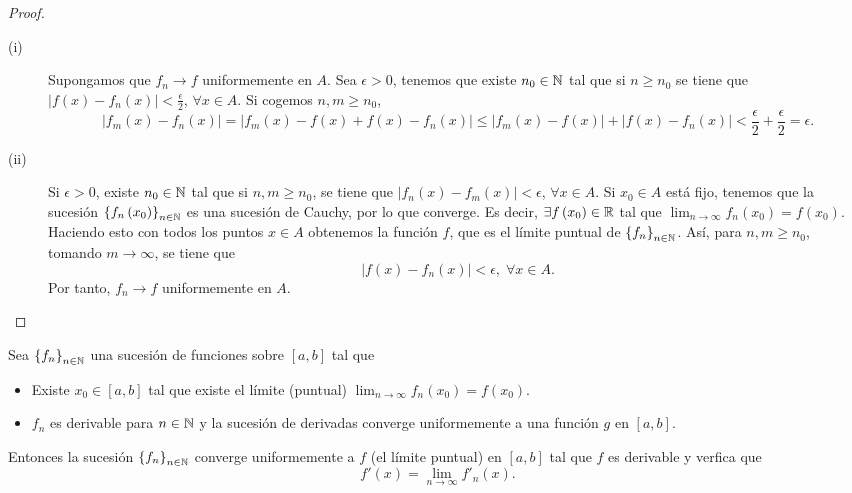 \begin{proof}
\begin{description}
\item[(i)] Supongamos que $\displaystyle f_{n} \to f $ uniformemente en $\displaystyle A $. Sea $\displaystyle \epsilon > 0 $, tenemos que existe $\displaystyle n_{0} \in \mathbb{N} $ tal que si $\displaystyle n \geq n_{0} $ se tiene que $\displaystyle \left|f\left(x\right)-f_{n}\left(x\right)\right| < \frac{\epsilon }{2} $, $\displaystyle \forall x \in A $. Si cogemos $\displaystyle n,m \geq n_{0} $,
	\[ \left|f_{m}\left(x\right)-f_{n}\left(x\right)\right| = \left|f_{m}\left(x\right)-f\left(x\right)+f\left(x\right)-f_{n}\left(x\right)\right| \leq \left|f_{m}\left(x\right)-f\left(x\right)\right|+ \left|f\left(x\right)-f_{n}\left(x\right)\right| < \frac{\epsilon }{2} + \frac{\epsilon }{2} = \epsilon  .\]
\item[(ii)] Si $\displaystyle \epsilon > 0 $, existe $\displaystyle n_{0} \in \mathbb{N} $ tal que si $\displaystyle n,m \geq n_{0} $, se tiene que $\displaystyle \left|f_{n}\left(x\right)-f_{m}\left(x\right)\right|<\epsilon  $, $\displaystyle \forall x \in A $. Si $\displaystyle x_{0} \in A $ está fijo, tenemos que la sucesión $\displaystyle \left\{ f_{n}\left(x_{0}\right)\right\} _{n\in\mathbb{N}} $ es una sucesión de Cauchy, por lo que converge. Es decir, $\displaystyle \exists f\left(x_{0}\right) \in \mathbb{R} $ tal que $\displaystyle \lim_{n \to \infty}f_{n}\left(x_{0}\right) = f\left(x_{0}\right) $. 
	Haciendo esto con todos los puntos $\displaystyle x \in A $ obtenemos la función $\displaystyle f $, que es el límite puntual de $\displaystyle \left\{ f_{n}\right\} _{n\in\mathbb{N}} $. Así, para $\displaystyle n,m \geq n_{0} $, tomando $\displaystyle m \to \infty $, se tiene que
	\[ \left|f\left(x\right)-f_{n}\left(x\right)\right| < \epsilon, \; \forall x \in A.\]
	Por tanto, $\displaystyle f_{n} \to f $ uniformemente en $\displaystyle A $.
\end{description}
\end{proof}
\begin{ftheorem}[]
	\normalfont Sea $\displaystyle \left\{ f_{n}\right\} _{n\in\mathbb{N}} $ una sucesión de funciones sobre $\displaystyle \left[a,b\right]  $ tal que
	\begin{itemize}
	\item Existe $\displaystyle x_{0} \in \left[a,b\right]  $ tal que existe el límite (puntual) $\displaystyle \lim_{n \to \infty}f_{n}\left(x_{0}\right) = f\left(x_{0}\right) $.
\item $\displaystyle f_{n} $ es derivable para $\displaystyle  n \in \mathbb{N} $ y la sucesión de derivadas converge uniformemente a una función $\displaystyle g $ en $\displaystyle \left[a,b\right]  $.
	\end{itemize}
	Entonces la sucesión $\displaystyle \left\{ f_{n}\right\} _{n\in\mathbb{N}} $ converge uniformemente a $\displaystyle f $ (el límite puntual) en $\displaystyle \left[a,b\right]  $ tal que $\displaystyle f $ es derivable y verfica que 
	\[ f'\left(x\right) = \lim_{n \to \infty}f'_{n}\left(x\right).\]
\end{ftheorem}
